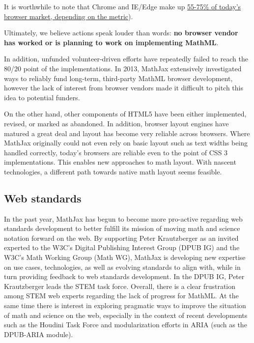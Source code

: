 \documentclass[]{amsart}
\begin{document}
It is worthwhile to note that Chrome and IE/Edge make up
\href{https://en.wikipedia.org/wiki/Usage_share_of_web_browsers\#Summary_tables}{55-75\%
of today's browser market, depending on the metric}).

Ultimately, we believe actions speak louder than words: \textbf{no
browser vendor has worked or is planning to work on implementing
MathML}.

In addition, unfunded volunteer-driven efforts have repeatedly failed to
reach the 80/20 point of the implementations. In 2013, MathJax
extensively investigated ways to reliably fund long-term, third-party
MathML browser development, however the lack of interest from browser
vendors made it difficult to pitch this idea to potential funders.

On the other hand, other components of HTML5 have been either
implemented, revised, or marked as abandoned. In addition, browser
layout engines have matured a great deal and layout has become very
reliable across browsers. Where MathJax originally could not even rely
on basic layout such as text widths being handled correctly, today's
browsers are reliable even to the point of CSS 3 implementations. This
enables new approaches to math layout. With nascent technologies, a
different path towards native math layout seems feasible.

\subsection{Web standards}\label{web-standards}

In the past year, MathJax has begun to become more pro-active regarding
web standards development to better fulfill its mission of moving math
and science notation forward on the web. By supporting Peter
Krautzberger as an invited experted to the W3C's Digital Publishing
Interest Group (DPUB IG) and the W3C's Math Working Group (Math WG),
MathJax is developing new expertise on use cases, technologies, as well
as evolving standards to align with, while in turn providing feedback to
web standards development. In the DPUB IG, Peter Krautzberger leads the
STEM task force. Overall, there is a clear frustration among STEM web
experts regarding the lack of progress for MathML. At the same time
there is interest in exploring pragmatic ways to improve the situation
of math and science on the web, especially in the context of recent
developments such as the Houdini Task Force and modularization efforts
in ARIA (such as the DPUB-ARIA module).
\end{document}
